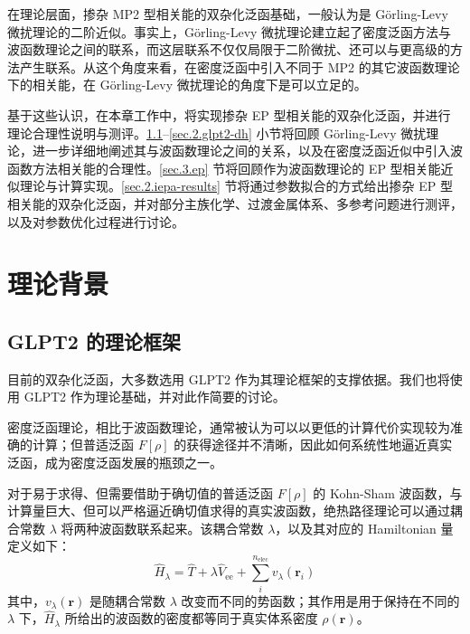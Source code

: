 在理论层面，掺杂 MP2 型相关能的双杂化泛函基础，一般认为是 G\"orling-Levy 微扰理论的二阶近似。事实上，G\"orling-Levy 微扰理论建立起了密度泛函方法与波函数理论之间的联系，而这层联系不仅仅局限于二阶微扰、还可以与更高级的方法产生联系。从这个角度来看，在密度泛函中引入不同于 MP2 的其它波函数理论下的相关能，在 G\"orling-Levy 微扰理论的角度下是可以立足的。

基于这些认识，在本章工作中，将实现掺杂 EP 型相关能的双杂化泛函，并进行理论合理性说明与测评。\ref{sec.2.glpt2-theory}--\ref{sec.2.glpt2-dh} 小节将回顾 G\"orling-Levy 微扰理论，进一步详细地阐述其与波函数理论之间的关系，以及在密度泛函近似中引入波函数方法相关能的合理性。\ref{sec.3.ep} 节将回顾作为波函数理论的 EP 型相关能近似理论与计算实现。\ref{sec.2.iepa-results} 节将通过参数拟合的方式给出掺杂 EP 型相关能的双杂化泛函，并对部分主族化学、过渡金属体系、多参考问题进行测评，以及对参数优化过程进行讨论。

\section{理论背景}

\subsection{GLPT2 的理论框架}
\label{sec.2.glpt2-theory}

目前的双杂化泛函，大多数选用 GLPT2 作为其理论框架的支撑依据。我们也将使用 GLPT2 作为理论基础，并对此作简要的讨论。

密度泛函理论，相比于波函数理论，通常被认为可以以更低的计算代价实现较为准确的计算；但普适泛函 $F[\rho]$ 的获得途径并不清晰，因此如何系统性地逼近真实泛函，成为密度泛函发展的瓶颈之一。

对于易于求得、但需要借助于确切值的普适泛函 $F[\rho]$ 的 Kohn-Sham 波函数，与计算量巨大、但可以严格逼近确切值求得的真实波函数，绝热路径理论可以通过耦合常数 $\lambda$ 将两种波函数联系起来。该耦合常数 $\lambda$，以及其对应的 Hamiltonian 量定义如下：
\begin{equation}
  \label{eq.2.H-lambda-ac}
  \hat H_\lambda = \hat T + \lambda \hat V_\mathrm{ee} + \sum_i^{n_\mathrm{elec}} v_{\lambda}(\bm{r}_i)
\end{equation}
其中，$v_{\lambda}(\bm{r})$ 是随耦合常数 $\lambda$ 改变而不同的势函数；其作用是用于保持在不同的 $\lambda$ 下，$\hat H_\lambda$ 所给出的波函数的密度都等同于真实体系密度 $\rho(\bm{r})$。

